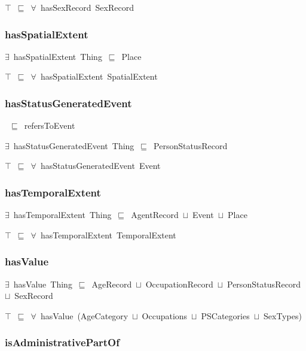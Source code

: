 \documentclass{article}
\begin{document}
\ensuremath{\top}~\ensuremath{\sqsubseteq}~\ensuremath{\forall}~hasSexRecord~SexRecord

\subsubsection*{hasSpatialExtent}

\ensuremath{\exists}~hasSpatialExtent~Thing~\ensuremath{\sqsubseteq}~Place

\ensuremath{\top}~\ensuremath{\sqsubseteq}~\ensuremath{\forall}~hasSpatialExtent~SpatialExtent

\subsubsection*{hasStatusGeneratedEvent}

~\ensuremath{\sqsubseteq}~refersToEvent

\ensuremath{\exists}~hasStatusGeneratedEvent~Thing~\ensuremath{\sqsubseteq}~PersonStatusRecord

\ensuremath{\top}~\ensuremath{\sqsubseteq}~\ensuremath{\forall}~hasStatusGeneratedEvent~Event

\subsubsection*{hasTemporalExtent}

\ensuremath{\exists}~hasTemporalExtent~Thing~\ensuremath{\sqsubseteq}~AgentRecord~\ensuremath{\sqcup}~Event~\ensuremath{\sqcup}~Place

\ensuremath{\top}~\ensuremath{\sqsubseteq}~\ensuremath{\forall}~hasTemporalExtent~TemporalExtent

\subsubsection*{hasValue}

\ensuremath{\exists}~hasValue~Thing~\ensuremath{\sqsubseteq}~AgeRecord~\ensuremath{\sqcup}~OccupationRecord~\ensuremath{\sqcup}~PersonStatusRecord~\ensuremath{\sqcup}~SexRecord

\ensuremath{\top}~\ensuremath{\sqsubseteq}~\ensuremath{\forall}~hasValue~(AgeCategory~\ensuremath{\sqcup}~Occupations~\ensuremath{\sqcup}~PSCategories~\ensuremath{\sqcup}~SexTypes)

\subsubsection*{isAdministrativePartOf}
\end{document}
